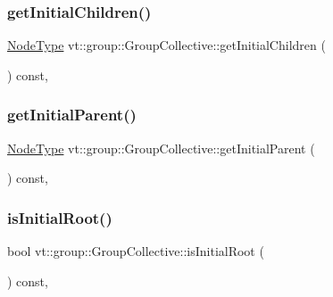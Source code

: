 \subsubsection{\texorpdfstring{get\+Initial\+Children()}{getInitialChildren()}}
{\footnotesize\ttfamily \hyperlink{namespacevt_a866da9d0efc19c0a1ce79e9e492f47e2}{Node\+Type} vt\+::group\+::\+Group\+Collective\+::get\+Initial\+Children (\begin{DoxyParamCaption}{ }\end{DoxyParamCaption}) const\hspace{0.3cm}{\ttfamily [inline]}, {\ttfamily [protected]}}

\mbox{\label{structvt_1_1group_1_1_group_collective_ac8af818af1d4d5c340690bafcdd733d6}} 
\subsubsection{\texorpdfstring{get\+Initial\+Parent()}{getInitialParent()}}
{\footnotesize\ttfamily \hyperlink{namespacevt_a866da9d0efc19c0a1ce79e9e492f47e2}{Node\+Type} vt\+::group\+::\+Group\+Collective\+::get\+Initial\+Parent (\begin{DoxyParamCaption}{ }\end{DoxyParamCaption}) const\hspace{0.3cm}{\ttfamily [inline]}, {\ttfamily [protected]}}

\mbox{\label{structvt_1_1group_1_1_group_collective_a7886a22a287c1a14ec107bdfc38d297e}} 
\subsubsection{\texorpdfstring{is\+Initial\+Root()}{isInitialRoot()}}
{\footnotesize\ttfamily bool vt\+::group\+::\+Group\+Collective\+::is\+Initial\+Root (\begin{DoxyParamCaption}{ }\end{DoxyParamCaption}) const\hspace{0.3cm}{\ttfamily [inline]}, {\ttfamily [protected]}}



